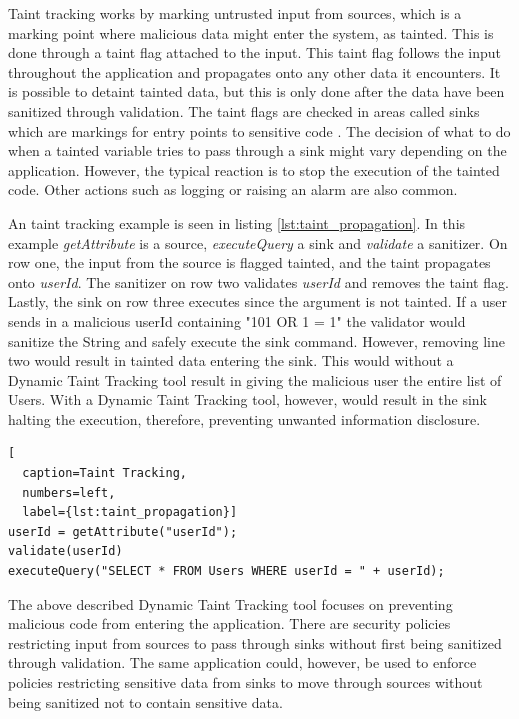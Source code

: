 Taint tracking works by marking untrusted input from sources, which is a marking point where malicious data might enter the system, as tainted. This is done through a taint flag attached to the input. This taint flag follows the input throughout the application and propagates onto any other data it encounters. It is possible to detaint tainted data, but this is only done after the data have been sanitized through validation. The taint flags are checked in areas called sinks which are markings for entry points to sensitive code \parencite{Pan2015, Venkataramani2008}. The decision of what to do when a tainted variable tries to pass through a sink might vary depending on the application. However, the typical reaction is to stop the execution of the tainted code. Other actions such as logging or raising an alarm are also common.

An taint tracking example is seen in listing \ref{lst:taint_propagation}. In this example \textit{getAttribute} is a source, \textit{executeQuery} a sink and \textit{validate} a sanitizer. On row one, the input from the source is flagged tainted, and the taint propagates onto \textit{userId}. The sanitizer on row two validates \textit{userId} and removes the taint flag. Lastly, the sink on row three executes since the argument is not tainted. If a user sends in a malicious userId containing "101 OR 1 = 1" the validator would sanitize the String and safely execute the sink command. However, removing line two would result in tainted data entering the sink. This would without a Dynamic Taint Tracking tool result in giving the malicious user the entire list of Users. With a Dynamic Taint Tracking tool, however, would result in the sink halting the execution, therefore, preventing unwanted information disclosure.

\hfill
\begin{lstlisting}[
  caption=Taint Tracking,
  numbers=left,
  label={lst:taint_propagation}]
userId = getAttribute("userId");
validate(userId)
executeQuery("SELECT * FROM Users WHERE userId = " + userId);
\end{lstlisting}
\hfill

The above described Dynamic Taint Tracking tool focuses on preventing malicious code from entering the application. There are security policies restricting input from sources to pass through sinks without first being sanitized through validation. The same application could, however, be used to enforce policies restricting sensitive data from sinks to move through sources without being sanitized not to contain sensitive data.

